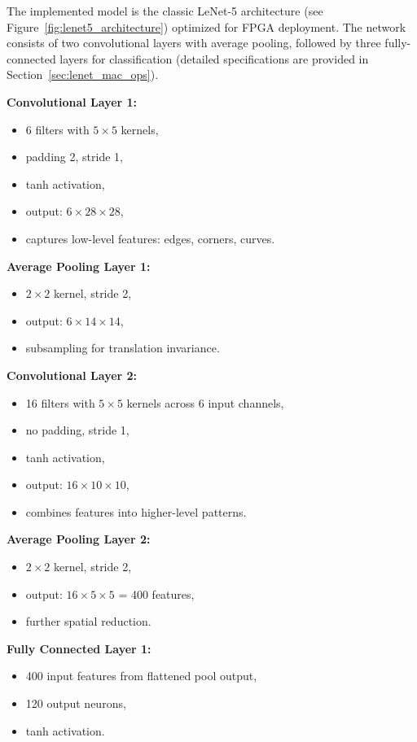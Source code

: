 \documentclass[12pt,a4paper]{report}
\begin{document}
The implemented model is the classic LeNet-5 architecture (see Figure~\ref{fig:lenet5_architecture}) optimized for FPGA deployment. The network consists of two convolutional layers with average pooling, followed by three fully-connected layers for classification (detailed specifications are provided in Section~\ref{sec:lenet_mac_ops}).

\textbf{Convolutional Layer 1:}
\begin{itemize}
    \item 6 filters with $5 \times 5$ kernels,
    \item padding 2, stride 1,
    \item tanh activation,
    \item output: $6 \times 28 \times 28$,
    \item captures low-level features: edges, corners, curves.
\end{itemize}

\textbf{Average Pooling Layer 1:}
\begin{itemize}
    \item $2 \times 2$ kernel, stride 2,
    \item output: $6 \times 14 \times 14$,
    \item subsampling for translation invariance.
\end{itemize}

\textbf{Convolutional Layer 2:}
\begin{itemize}
    \item 16 filters with $5 \times 5$ kernels across 6 input channels,
    \item no padding, stride 1,
    \item tanh activation,
    \item output: $16 \times 10 \times 10$,
    \item combines features into higher-level patterns.
\end{itemize}

\textbf{Average Pooling Layer 2:}
\begin{itemize}
    \item $2 \times 2$ kernel, stride 2,
    \item output: $16 \times 5 \times 5$ = 400 features,
    \item further spatial reduction.
\end{itemize}

\textbf{Fully Connected Layer 1:}
\begin{itemize}
    \item 400 input features from flattened pool output,
    \item 120 output neurons,
    \item tanh activation.
\end{itemize}
\end{document}
